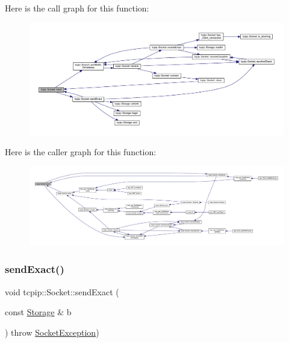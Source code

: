 Here is the call graph for this function\+:\nopagebreak
\begin{figure}[H]
\begin{center}
\leavevmode
\includegraphics[width=350pt]{classtcpip_1_1_socket_acb91f20e7a532159a8daa2796fa4abd4_cgraph}
\end{center}
\end{figure}
Here is the caller graph for this function\+:\nopagebreak
\begin{figure}[H]
\begin{center}
\leavevmode
\includegraphics[width=350pt]{classtcpip_1_1_socket_acb91f20e7a532159a8daa2796fa4abd4_icgraph}
\end{center}
\end{figure}
\mbox{\label{classtcpip_1_1_socket_a6d00027b40f48d4ae19e3fff2e89f7ab}} 
\subsubsection{\texorpdfstring{send\+Exact()}{sendExact()}}
{\footnotesize\ttfamily void tcpip\+::\+Socket\+::send\+Exact (\begin{DoxyParamCaption}\item[{const \hyperlink{classtcpip_1_1_storage}{Storage} \&}]{b }\end{DoxyParamCaption}) throw  \hyperlink{classtcpip_1_1_socket_exception}{Socket\+Exception}) }

